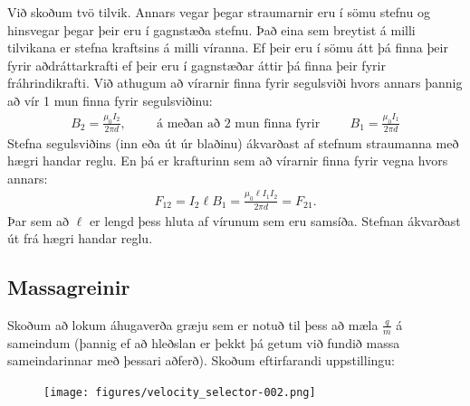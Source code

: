 Við skoðum tvö tilvik. Annars vegar þegar straumarnir eru í sömu stefnu og hinsvegar þegar þeir eru í gagnstæða stefnu. Það eina sem breytist á milli tilvikana er stefna kraftsins á milli víranna. Ef þeir eru í sömu átt þá finna þeir fyrir aðdráttarkrafti ef þeir eru í gagnstæðar áttir þá finna þeir fyrir fráhrindikrafti. Við athugum að vírarnir finna fyrir segulsviði hvors annars þannig að vír 1 mun finna fyrir segulsviðinu:
\begin{align*}
    B_2 = \frac{\mu_0 I_2}{2 \pi d}, \hspace{1cm} \text{á meðan að $2$ mun finna fyrir} \hspace{1cm} B_1 = \frac{\mu_0 I_1}{2\pi d}
\end{align*}
Stefna segulsviðins (inn eða út úr blaðinu) ákvarðast af stefnum straumanna með hægri handar reglu. En þá er krafturinn sem að vírarnir finna fyrir vegna hvors annars:
\begin{align*}
    F_{12} = I_2 \ell B_1 = \frac{\mu_0 \ell I_1 I_2}{2 \pi d} = F_{21}.
\end{align*}
Þar sem að $\ell$ er lengd þess hluta af vírunum sem eru samsíða. Stefnan ákvarðast út frá hægri handar reglu.


\subsection*{Massagreinir}

Skoðum að lokum áhugaverða græju sem er notuð til þess að mæla $\frac{q}{m}$ á sameindum (þannig ef að hleðslan er þekkt þá getum við fundið massa sameindarinnar með þessari aðferð). Skoðum eftirfarandi uppstillingu:

\begin{figure}[H]
    \centering
    \texttt{[image: figures/velocity\_selector-002.png]}
\end{figure}

